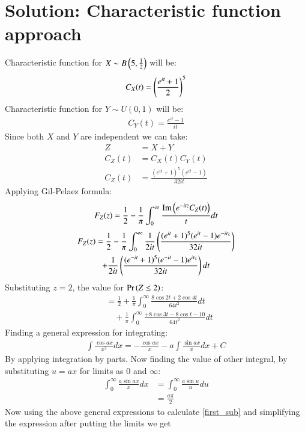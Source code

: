 \documentclass[journal,12pt,twocolumn]{IEEEtran}
\begin{document}
\section*{Solution: Characteristic function approach}
Characteristic function for $X \sim B\left(5,\frac{1}{2}\right)$ will be:
\begin{align}
    C_X(t)=\left(\frac{e^{it}+1}{2}\right)^5
\end{align}
Characteristic function for $Y \sim U(0,1)$ will be:
\begin{align}
    C_Y(t)=\frac{e^{it}-1}{it}
\end{align}
Since both $X$ and $Y$ are independent we can take:
\begin{align}
    Z&=X+Y\\
    C_Z(t)&=C_X(t)C_Y(t)\\
    C_Z(t)&= \frac{(e^{it}+1)^5(e^{it}-1)}{32it}
\end{align}
Applying Gil-Pelaez formula:
\begin{align}
    F_Z(z)=\frac{1}{2}-\frac{1}{\pi}\int_0^\infty \frac{\text{Im}\left(e^{-itz}C_Z(t)\right)}{t}dt
\end{align}
\begin{multline*}
    F_Z(z)=\frac{1}{2}-\frac{1}{\pi}\int_0^\infty\frac{1}{2it}\left(\frac{(e^{it}+1)^5(e^{it}-1)e^{-itz}}{32it}\right)\\+\frac{1}{2it}\left(\frac{(e^{-it}+1)^5(e^{-it}-1)e^{itz}}{32it}\right)dt
\end{multline*}
Substituting $z=2$, the value for $\Pr\left(Z\leq 2\right)$:
\begin{align}
\nonumber
    &=\frac{1}{2}+\frac{1}{\pi}\int_0^\infty \frac{8\cos{2t}+2\cos{4t}}{64t^2}dt\\
    &\quad+\frac{1}{\pi}\int_0^\infty\frac{+8\cos{3t}-8\cos{t}-10}{64t^2}dt\label{first_sub}
\end{align}
Finding a general expression for integrating:
\begin{align}
    \int \frac{\cos{ax}}{x^2}dx=-\frac{\cos{ax}}{x}-a\int\frac{\sin{ax}}{x}dx + C\label{gen1}
\end{align}
By applying integration by parts. Now finding the value of other integral, by substituting $u=ax$ for limits as $0$ and $\infty$:
\begin{align}
    \int_0^\infty\frac{a\sin{ax}}{x}dx &= \int_0^\infty\frac{a\sin{u}}{u}du\\
    &=\frac{a\pi}{2}\label{gen2}
\end{align}
Now using the above general expressions to calculate \eqref{first_sub} and simplifying the expression after putting the limits we get
\end{document}

